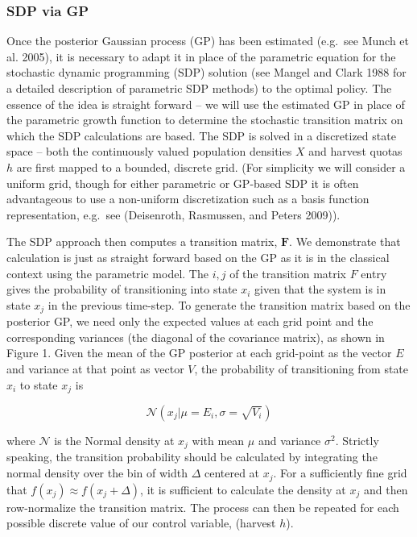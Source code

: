 \documentclass[author-year, review]{elsarticle} %
\begin{document}
\subsubsection{SDP via GP}\label{sdp-via-gp}

Once the posterior Gaussian process (GP) has been estimated (e.g.~see
Munch et al. 2005), it is necessary to adapt it in place of the
parametric equation for the stochastic dynamic programming (SDP)
solution (see Mangel and Clark 1988 for a detailed description of
parametric SDP methods) to the optimal policy. The essence of the idea
is straight forward -- we will use the estimated GP in place of the
parametric growth function to determine the stochastic transition matrix
on which the SDP calculations are based. The SDP is solved in a
discretized state space -- both the continuously valued population
densities $X$ and harvest quotas $h$ are first mapped to a bounded,
discrete grid. (For simplicity we will consider a uniform grid, though
for either parametric or GP-based SDP it is often advantageous to use a
non-uniform discretization such as a basis function representation,
e.g.~see (Deisenroth, Rasmussen, and Peters 2009)).

The SDP approach then computes a transition matrix, $\mathbf{F}$. We
demonstrate that calculation is just as straight forward based on the GP
as it is in the classical context using the parametric model. The
${i,j}$ of the transition matrix $F$ entry gives the probability of
transitioning into state $x_i$ given that the system is in state $x_j$
in the previous time-step. To generate the transition matrix based on
the posterior GP, we need only the expected values at each grid point
and the corresponding variances (the diagonal of the covariance matrix),
as shown in Figure 1. Given the mean of the GP posterior at each
grid-point as the vector $E$ and variance at that point as vector $V$,
the probability of transitioning from state $x_i$ to state $x_j$ is

\[\mathcal{N}\left(x_j | \mu = E_i, \sigma = \sqrt{V_i}\right)\]

where $\mathcal{N}$ is the Normal density at $x_j$ with mean $\mu$ and
variance $\sigma^2$. Strictly speaking, the transition probability
should be calculated by integrating the normal density over the bin of
width $\Delta$ centered at $x_j$. For a sufficiently fine grid that
$f(x_j) \approx f(x_j + \Delta)$, it is sufficient to calculate the
density at $x_j$ and then row-normalize the transition matrix. The
process can then be repeated for each possible discrete value of our
control variable, (harvest $h$).
\end{document}
